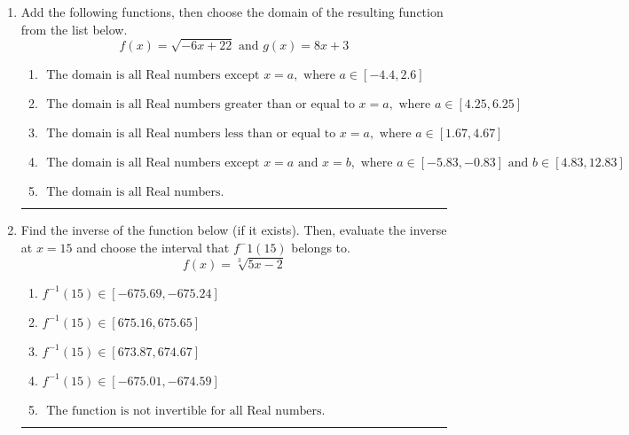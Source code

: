 \documentclass[14pt]{extbook}
\newcommand{\litem}[1]{\item#1\hspace*{-1cm}\rule{\textwidth}{0.4pt}}
\begin{document}
\begin{enumerate}
{\begin{enumerate}[label=\Alph*.]
\end{enumerate} }
\litem{
Add the following functions, then choose the domain of the resulting function from the list below.\[ f(x) = \sqrt{-6x+22}  \text{ and } g(x) = 8x + 3 \]\begin{enumerate}[label=\Alph*.]
\item \( \text{ The domain is all Real numbers except } x = a, \text{ where } a \in [-4.4, 2.6] \)
\item \( \text{ The domain is all Real numbers greater than or equal to } x = a, \text{ where } a \in [4.25, 6.25] \)
\item \( \text{ The domain is all Real numbers less than or equal to } x = a, \text{ where } a \in [1.67, 4.67] \)
\item \( \text{ The domain is all Real numbers except } x = a \text{ and } x = b, \text{ where } a \in [-5.83, -0.83] \text{ and } b \in [4.83, 12.83] \)
\item \( \text{ The domain is all Real numbers. } \)

\end{enumerate} }
\litem{
Find the inverse of the function below (if it exists). Then, evaluate the inverse at $x = 15$ and choose the interval that $f^-1(15)$ belongs to.\[ f(x) = \sqrt[3]{5 x - 2} \]\begin{enumerate}[label=\Alph*.]
\item \( f^{-1}(15) \in [-675.69, -675.24] \)
\item \( f^{-1}(15) \in [675.16, 675.65] \)
\item \( f^{-1}(15) \in [673.87, 674.67] \)
\item \( f^{-1}(15) \in [-675.01, -674.59] \)
\item \( \text{ The function is not invertible for all Real numbers. } \)

\end{enumerate} }
\end{enumerate}
\end{document}

